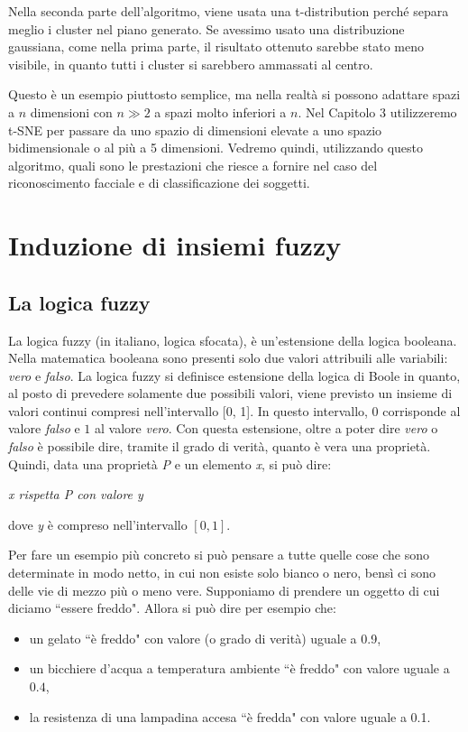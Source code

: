 \documentclass[12pt,italian]{report}
\begin{document}
Nella seconda parte dell'algoritmo, viene usata una t-distribution perché separa meglio i cluster nel piano generato. Se avessimo usato una distribuzione gaussiana, come nella prima parte, il risultato ottenuto sarebbe stato meno visibile, in quanto tutti i cluster si sarebbero ammassati al centro.

Questo è un esempio piuttosto semplice, ma nella realtà si possono adattare spazi a $n$ dimensioni con $ n \gg 2 $ a spazi molto inferiori a $n$. Nel Capitolo 3 utilizzeremo t-SNE per passare da uno spazio di dimensioni elevate a uno spazio bidimensionale o al più a 5 dimensioni. Vedremo quindi, utilizzando questo algoritmo, quali sono le prestazioni che riesce a fornire nel caso del riconoscimento facciale e di classificazione dei soggetti.
% 
% 


\chapter{Induzione di insiemi fuzzy}
\label{ch:prova}

\section{La logica fuzzy}
La logica fuzzy (in italiano, logica sfocata), è un'estensione della logica booleana. Nella matematica booleana sono presenti solo due valori attribuili alle variabili: \emph{vero} e \emph{falso}. 
La logica fuzzy si definisce estensione della logica di Boole in quanto, al posto di prevedere solamente due possibili valori, viene previsto un insieme di valori continui compresi nell'intervallo [0, 1]. In questo intervallo, $0$ corrisponde al valore \emph{falso} e $1$ al valore \emph{vero}. Con questa estensione, oltre a poter dire \emph{vero} o \emph{falso} è possibile dire, tramite il grado di verità, quanto è vera una proprietà.
Quindi, data una proprietà \emph{P} e un elemento \emph{x}, si può dire:

\begin{center}
	\centering
	{

		\em{x rispetta P con valore y}
		
	}
\end{center} 
dove \emph{y} è compreso nell'intervallo $ [0,1] $.

Per fare un esempio più concreto si può pensare a tutte quelle cose che sono determinate in modo netto, in cui non esiste solo bianco o nero, bensì ci sono delle vie di mezzo più o meno vere.
Supponiamo di prendere un oggetto di cui diciamo ``essere freddo". Allora si può dire per esempio che:
\begin{itemize}
	\item un gelato ``è freddo" con valore (o grado di verità) uguale a 0.9,
	\item un bicchiere d'acqua a temperatura ambiente ``è freddo" con valore uguale a $ 0.4 $,
	\item la resistenza di una lampadina accesa ``è fredda" con valore uguale a 0.1.
\end{itemize}
\end{document}
